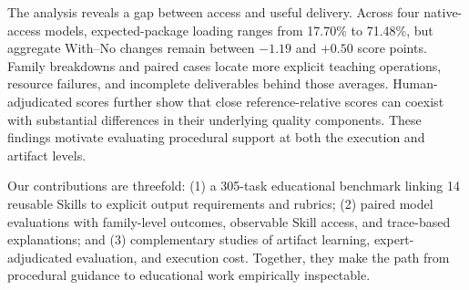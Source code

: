 The analysis reveals a gap between access and useful delivery. Across four
native-access models, expected-package loading ranges from 17.70\% to 71.48\%,
but aggregate With--No changes remain between $-1.19$ and $+0.50$ score points.
Family breakdowns and paired cases locate more explicit teaching operations,
resource failures, and incomplete deliverables behind those averages.
Human-adjudicated scores further show that close reference-relative scores can
coexist with substantial differences in their underlying quality components.
These findings motivate evaluating procedural support at both the execution
and artifact levels.

Our contributions are threefold: (1) a 305-task educational benchmark linking
14 reusable Skills to explicit output requirements and rubrics; (2) paired
model evaluations with family-level outcomes, observable Skill access, and
trace-based explanations; and (3) complementary studies of artifact learning,
expert-adjudicated evaluation, and execution cost. Together, they make the
path from procedural guidance to educational work empirically inspectable.
